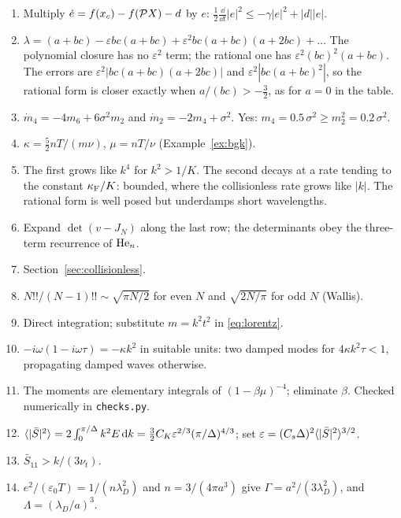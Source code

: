 \begin{enumerate}[label=\arabic*.]
  \item Multiply $\dot e=f(x_c)-f(\mathcal{P} X)-d$ by $e$:
    $\tfrac12\tfrac{\dd}{\dd t}|e|^2\le-\gamma|e|^2+|d||e|$.
  \item $\lambda=(a+bc)-\varepsilon bc(a+bc)
    +\varepsilon^2bc(a+bc)(a+2bc)+\dots$ The polynomial closure has no
    $\varepsilon^2$ term; the rational one has
    $\varepsilon^2(bc)^2(a+bc)$. The errors are
    $\varepsilon^2|bc(a+bc)(a+2bc)|$ and $\varepsilon^2|bc(a+bc)^2|$, so the
    rational form is closer exactly when $a/(bc)>-\tfrac32$, as for $a=0$
    in the table.
  \item $\dot m_4=-4m_6+6\sigma^2m_2$ and $\dot m_2=-2m_4+\sigma^2$. Yes:
    $m_4=0.5\,\sigma^2\ge m_2^2=0.2\,\sigma^2$.
  \item $\kappa=\tfrac52nT/(m\nu)$, $\mu=nT/\nu$ (Example~\ref{ex:bgk}).
  \item The first grows like $k^4$ for $k^2>1/K$. The second decays at a
    rate tending to the constant $\kappa_{\mathrm F}/K$: bounded, where the collisionless
    rate grows like $|k|$. The rational form is well posed but
    underdamps short wavelengths.
  \item Expand $\det(v-J_N)$ along the last row; the determinants obey the
    three-term recurrence of $\mathrm{He}_n$.
  \item Section~\ref{sec:collisionless}.
  \item $N!!/(N-1)!!\sim\sqrt{\pi N/2}$ for even $N$ and
    $\sqrt{2N/\pi}$ for odd $N$ (Wallis).
  \item Direct integration; substitute $m=k^2t^2$ in \eqref{eq:lorentz}.
  \item $-i\omega(1-i\omega\tau)=-\kappa k^2$ in suitable units: two
    damped modes for $4\kappa k^2\tau<1$, propagating damped waves
    otherwise.
  \item The moments are elementary integrals of $(1-\beta\mu)^{-4}$;
    eliminate $\beta$. Checked numerically in \texttt{checks.py}.
  \item $\langle |\bar S|^2 \rangle=2\int_0^{\pi/\Delta}k^2E\,\mathrm{d} k
    =\tfrac32C_K\varepsilon^{2/3}(\pi/\Delta)^{4/3}$; set
    $\varepsilon=(C_s\Delta)^2\langle |\bar S|^2 \rangle^{3/2}$.
  \item $\bar S_{11}>k/(3\nu_t)$.
  \item $e^2/(\varepsilon_0T)=1/(n\lambda_D^2)$ and $n=3/(4\pi a^3)$ give
    $\Gamma=a^2/(3\lambda_D^2)$, and $\Lambda=(\lambda_D/a)^3$.
\end{enumerate}

